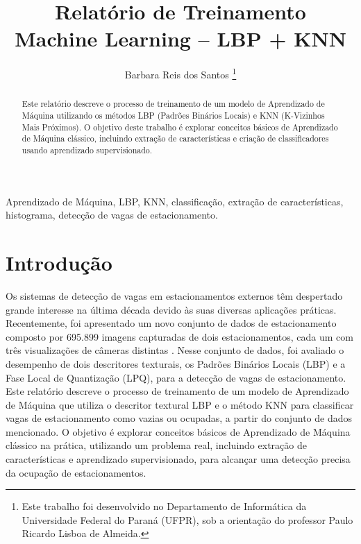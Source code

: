 \documentclass[lettersize,journal]{IEEEtran}
\begin{document}
\title{Relatório de Treinamento \\ Machine Learning – LBP + KNN}
\author{Barbara Reis dos Santos
\thanks{Este trabalho foi desenvolvido no Departamento de Informática da Universidade Federal do Paraná (UFPR), sob a orientação do professor Paulo Ricardo Lisboa de Almeida.}}
\maketitle

\begin{abstract}
Este relatório descreve o processo de treinamento de um modelo de Aprendizado de Máquina utilizando os métodos LBP (Padrões Binários Locais) e KNN (K-Vizinhos Mais Próximos). O objetivo deste trabalho é explorar conceitos básicos de Aprendizado de Máquina clássico, incluindo extração de características e criação de classificadores usando aprendizado supervisionado.
\end{abstract}

\begin{IEEEkeywords}
Aprendizado de Máquina, LBP, KNN, classificação, extração de características, histograma, detecção de vagas de estacionamento.
\end{IEEEkeywords}

\section{Introdução}

Os sistemas de detecção de vagas em estacionamentos externos têm despertado grande interesse na última década devido às suas diversas aplicações práticas. Recentemente, foi apresentado um novo conjunto de dados de estacionamento composto por 695.899 imagens capturadas de dois estacionamentos, cada um com três visualizações de câmeras distintas \cite{almeida2015pklot}. Nesse conjunto de dados, foi avaliado o desempenho de dois descritores texturais, os Padrões Binários Locais (LBP) e a Fase Local de Quantização (LPQ), para a detecção de vagas de estacionamento. Este relatório descreve o processo de treinamento de um modelo de Aprendizado de Máquina que utiliza o descritor textural LBP e o método KNN para classificar vagas de estacionamento como vazias ou ocupadas, a partir do conjunto de dados mencionado. O objetivo é explorar conceitos básicos de Aprendizado de Máquina clássico na prática, utilizando um problema real, incluindo extração de características e aprendizado supervisionado, para alcançar uma detecção precisa da ocupação de estacionamentos.
\end{document}
